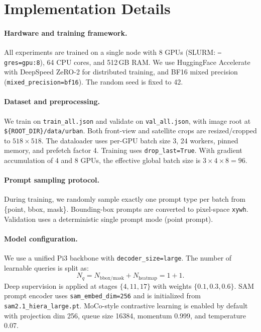 \section{Implementation Details}
\label{sec:impl}

\paragraph{Hardware and training framework.}
All experiments are trained on a single node with 8 GPUs (SLURM: \texttt{--gres=gpu:8}), 64 CPU cores, and 512\,GB RAM.
We use HuggingFace Accelerate with DeepSpeed ZeRO-2 for distributed training, and BF16 mixed precision (\texttt{mixed\_precision=bf16}).
The random seed is fixed to 42.

\paragraph{Dataset and preprocessing.}
We train on \texttt{train\_all.json} and validate on \texttt{val\_all.json}, with image root at \texttt{\$\{ROOT\_DIR\}/data/urban}.
Both front-view and satellite crops are resized/cropped to $518\times518$.
The dataloader uses per-GPU batch size 3, 24 workers, pinned memory, and prefetch factor 4.
Training uses \texttt{drop\_last=True}.
With gradient accumulation of 4 and 8 GPUs, the effective global batch size is $3\times4\times8=96$.

\paragraph{Prompt sampling protocol.}
During training, we randomly sample exactly one prompt type per batch from \{point, bbox, mask\}.
Bounding-box prompts are converted to pixel-space \texttt{xywh}.
Validation uses a deterministic single prompt mode (point prompt).

\paragraph{Model configuration.}
We use a unified Pi3 backbone with \texttt{decoder\_size=large}.
The number of learnable queries is split as:
\[
N_q = N_{\text{bbox/mask}} + N_{\text{heatmap}} = 1 + 1.
\]
Deep supervision is applied at stages $\{4,11,17\}$ with weights $\{0.1,0.3,0.6\}$.
SAM prompt encoder uses \texttt{sam\_embed\_dim=256} and is initialized from \texttt{sam2.1\_hiera\_large.pt}.
MoCo-style contrastive learning is enabled by default with projection dim 256, queue size 16384, momentum 0.999, and temperature 0.07.

